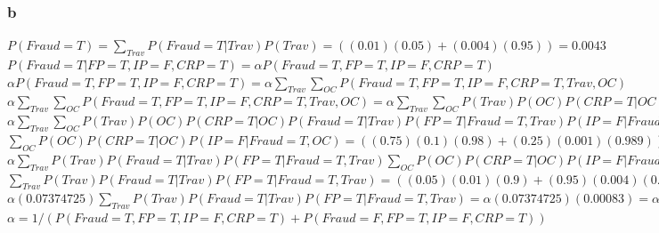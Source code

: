 \documentclass{article}
\begin{document}
\subsubsection*{b}
$P(Fraud = T) = \sum_{Trav} P(Fraud = T | Trav)P(Trav) = ((0.01)(0.05)+(0.004)(0.95)) = 0.0043$
\newline
\newline
\noindent
$P(Fraud = T | FP = T, IP = F, CRP = T) = \alpha P(Fraud = T, FP = T, IP = F, CRP = T)$
\newline
\newline
$\alpha P(Fraud = T, FP = T, IP = F, CRP = T) = \alpha \sum_{Trav} \sum_{OC} P(Fraud = T, FP = T, IP = F, CRP = T, Trav, OC)$
\newline
\newline
$\alpha \sum_{Trav} \sum_{OC} P(Fraud = T, FP = T, IP = F, CRP = T, Trav, OC) = \alpha \sum_{Trav} \sum_{OC} P(Trav)P(OC)P(CRP = T | OC)P(Fraud = T | Trav)P(FP = T | Fraud = T, Trav)P(IP = F | Fraud = T, OC)$
\newline
\newline
$\alpha \sum_{Trav} \sum_{OC} P(Trav)P(OC)P(CRP = T | OC)P(Fraud = T | Trav)P(FP = T | Fraud = T, Trav)P(IP = F | Fraud = T, OC) = \alpha \sum_{Trav} P(Trav)P(Fraud = T | Trav)P(FP = T | Fraud = T, Trav) \sum_{OC} P(OC)P(CRP = T | OC)P(IP = F | Fraud = T, OC)$
\newline
\newline
$\sum_{OC} P(OC)P(CRP = T | OC)P(IP = F | Fraud = T, OC) = ((0.75)(0.1)(0.98) + (0.25)(0.001)(0.989)) = 0.07374725$
\newline
\newline
$\alpha \sum_{Trav} P(Trav)P(Fraud = T | Trav)P(FP = T | Fraud = T, Trav) \sum_{OC} P(OC)P(CRP = T | OC)P(IP = F | Fraud = T, OC) = \alpha (0.07374725) \sum_{Trav} P(Trav)P(Fraud = T | Trav)P(FP = T | Fraud = T, Trav)$
\newline
\newline
$\sum_{Trav} P(Trav)P(Fraud = T | Trav)P(FP = T | Fraud = T, Trav) = ((0.05)(0.01)(0.9) + (0.95)(0.004)(0.1)) = 0.00083$
\newline
\newline
$\alpha (0.07374725) \sum_{Trav} P(Trav)P(Fraud = T | Trav)P(FP = T | Fraud = T, Trav) = \alpha (0.07374725)(0.00083) = \alpha (0.0000612102175)$
\newline
\newline
$\alpha = 1/(P(Fraud = T, FP = T, IP = F, CRP = T) + P(Fraud = F, FP = T, IP = F, CRP = T))$
\newline
\newline
\end{document}
